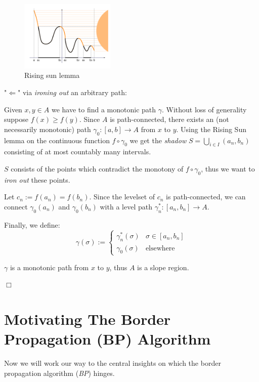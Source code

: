 \documentclass[a4paper,12pt,notitlepage,fullpage]{paper}
\theoremstyle{plain}
\theoremstyle{definition}
\begin{document}
$~$

\begin{figure}
\centering
\includegraphics[width=0.4\textwidth]{img/Rising_sun_lemma.png}
\caption{Rising sun lemma}
\label{fig:lemma_1}
\end{figure}

"$\Leftarrow$" via \emph{ironing out} an arbitrary path:

Given $x, y \in A$ we have to find a monotonic path $\gamma$. Without loss of generality suppose $f(x) \geq f(y)$. Since $A$ is path-connected, there exists an (not necessarily monotonic) path $\gamma_0: [a,b] \to A$ from $x$ to $y$. Using the Rising Sun lemma \cite{grill} on the continuous function $f \circ \gamma_0$ we get the \emph{shadow} $S = \bigcup_{i \in I} (a_n, b_n)$ consisting of at most countably many intervals.

$S$ consists of the points which contradict the monotony of $f \circ \gamma_0$, thus we want to \emph{iron out} these points.

Let $c_n := f(a_n) = f(b_n)$. Since the levelset of $c_n$ is path-connected, we can connect $\gamma_0(a_n)$ and $\gamma_0(b_n)$ with a level path $\gamma_n^* : [a_n, b_n] \to A.$

Finally, we define:
\begin{equation*}
\gamma(\sigma) :=
\begin{cases}
\gamma_n^*(\sigma) & \sigma \in [a_n, b_n] \\
\gamma_0(\sigma) & \text{elsewhere}
\end{cases}
\end{equation*}

$\gamma$ is a monotonic path from $x$ to $y$, thus $A$ is a slope region.

\hfill $\Box$



\section{Motivating The Border Propagation (BP) Algorithm}
Now we will work our way to the central insights on which the border propagation algorithm (\emph{BP}) hinges.
\end{document}
